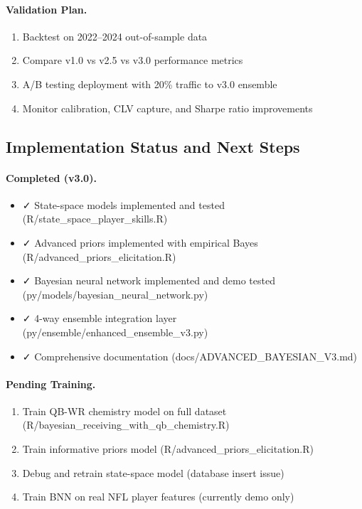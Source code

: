 \documentclass[12pt]{report}  %
\numberwithin{equation}{section}
\theoremstyle{plain}
\theoremstyle{definition}
\theoremstyle{remark}
\begin{document}
\paragraph{Validation Plan.}
\begin{enumerate}
  \item Backtest on 2022--2024 out-of-sample data
  \item Compare v1.0 vs v2.5 vs v3.0 performance metrics
  \item A/B testing deployment with 20\% traffic to v3.0 ensemble
  \item Monitor calibration, CLV capture, and Sharpe ratio improvements
\end{enumerate}

\subsection{Implementation Status and Next Steps}

\paragraph{Completed (v3.0).}
\begin{itemize}
  \item ✓ State-space models implemented and tested (R/state\_space\_player\_skills.R)
  \item ✓ Advanced priors implemented with empirical Bayes (R/advanced\_priors\_elicitation.R)
  \item ✓ Bayesian neural network implemented and demo tested (py/models/bayesian\_neural\_network.py)
  \item ✓ 4-way ensemble integration layer (py/ensemble/enhanced\_ensemble\_v3.py)
  \item ✓ Comprehensive documentation (docs/ADVANCED\_BAYESIAN\_V3.md)
\end{itemize}

\paragraph{Pending Training.}
\begin{enumerate}
  \item Train QB-WR chemistry model on full dataset (R/bayesian\_receiving\_with\_qb\_chemistry.R)
  \item Train informative priors model (R/advanced\_priors\_elicitation.R)
  \item Debug and retrain state-space model (database insert issue)
  \item Train BNN on real NFL player features (currently demo only)
\end{enumerate}
\end{document}
